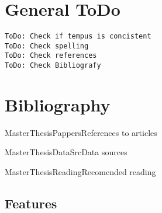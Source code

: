 \documentclass[a4paper]{article}
\begin{document}
\section{General ToDo}
\texttt{ToDo: Check if tempus is concistent} \\
\texttt{ToDo: Check spelling} \\
\texttt{ToDo: Check references} \\
\texttt{ToDo: Check Bibliografy} \\



\pagebreak
\section{Bibliography}
{MasterThesisPappers}{References to articles} 

{MasterThesisDataSrc}{Data sources} 

{MasterThesisReading}{Recomended reading} 

\pagebreak
\begin{appendices}

\section{Features} \label{sss:appendix_a}


\end{appendices}
\end{document}
